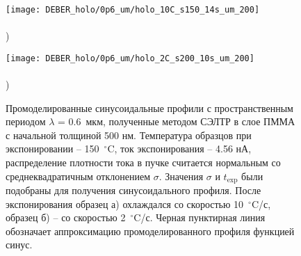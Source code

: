 \begin{figure}[b!]
	\begin{minipage}{0.48\textwidth}
		\texttt{[image: DEBER\_holo/0p6\_um/holo\_10C\_s150\_14s\_um\_200]} \\
		\vspace{-13em} \\ ) \\ \vspace{13em}
	\end{minipage}
	\begin{minipage}{0.48\textwidth}
		\texttt{[image: DEBER\_holo/0p6\_um/holo\_2C\_s200\_10s\_um\_200]} \\
		\vspace{-13em} \\ ) \\ \vspace{13em}
	\end{minipage}
	
	\vspace{-3em}
	\caption{Промоделированные синусоидальные профили с пространственным периодом $\lambda$ = 0.6~мкм, полученные методом СЭЛТР в слое ПММА с начальной толщиной 500 нм. Температура образцов при экспонировании -- 150~$^\circ$C, ток экспонирования -- 4.56 нА, распределение плотности тока в пучке считается нормальным со среднеквадратичным отклонением $\sigma$. Значения $\sigma$ и $t_\mathrm{exp}$ были подобраны для получения синусоидального профиля. После экспонирования образец а) охлаждался со скоростью 10~$^\circ$C/с, образец б) -- со скоростью 2~$^\circ$C/с. Черная пунктирная линия обозначает аппроксимацию промоделированного профиля функцией синус.}
	\label{fig:DEBER_holo_0p6um}
\end{figure}
